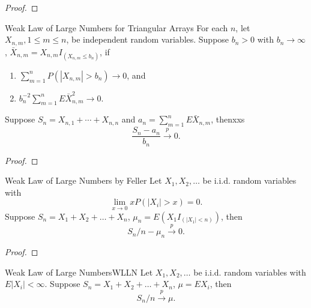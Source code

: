 \begin{proof}
    
\end{proof}

\begin{theorem}{Weak Law of Large Numbers for Triangular Arrays}{}
    For each $n$, let $X_{n,m},1\leq m\leq n$, be independent random variables. Suppose $b_n>0$ with $b_n\rightarrow\infty$, $\bar{X}_{n,m}=X_{n,m}I_{\left(X_{n,m}\leq b_n\right)}$, if
    \begin{enumerate}
        \item $\sum_{m=1}^{n}P\left(\left|X_{n,m}\right|>b_{n}\right)\rightarrow 0$, and
        \item $b_{n}^{-2}\sum_{m=1}^{n}E\bar{X}_{n,m}^{2}\rightarrow 0$.
    \end{enumerate}
    Suppose $S_{n}=X_{n, 1}+\cdots+X_{n,n}$ and $a_{n}=\sum_{m=1}^{n}E\bar{X}_{n,m}$, thenxxs
    \begin{equation}
        \frac{S_n-a_n}{b_n}\stackrel{p}{\rightarrow}0.
    \end{equation}
\end{theorem}

\begin{proof}
    
\end{proof}

\begin{theorem}{Weak Law of Large Numbers by Feller}{}
    Let $X_1,X_2,\ldots$ be i.i.d. random variables with
    \begin{equation}
        \lim_{x\rightarrow 0}xP(|X_i|>x)=0.
    \end{equation}
    Suppose $S_n=X_1+X_2+\ldots+X_n$, $\mu_n=E\left(X_1I_{(|X_1|<n)}\right)$, then
    \begin{equation}
        S_n/n-\mu_n\stackrel{p}{\rightarrow}0.
    \end{equation}
\end{theorem}

\begin{proof}
    
\end{proof}

\begin{theorem}{Weak Law of Large Numbers}{WLLN}
    Let $X_1,X_2,\ldots$ be i.i.d. random variables with $E|X_i|<\infty$. Suppose $S_n=X_1+X_2+\ldots+X_n$, $\mu=EX_i$, then
    \begin{equation}
        S_n/n\stackrel{p}{\rightarrow}\mu.
    \end{equation}
\end{theorem}

